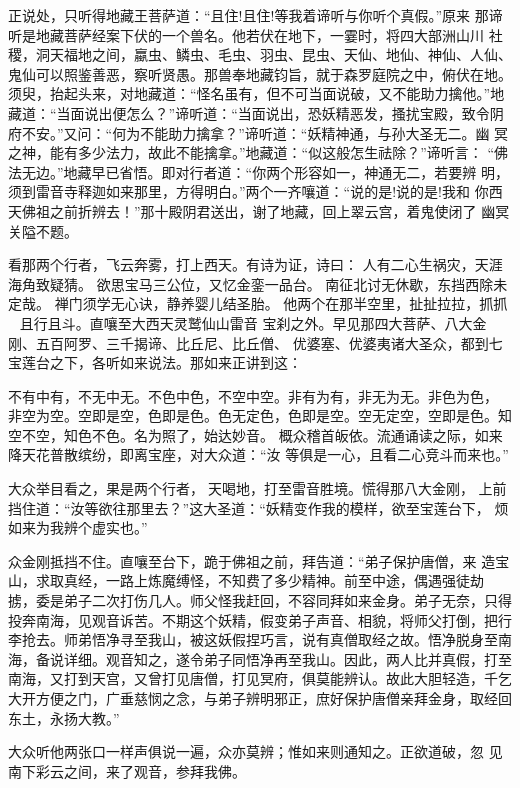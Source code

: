 正说处，只听得地藏王菩萨道：“且住!且住!等我着谛听与你听个真假。”原来
那谛听是地藏菩萨经案下伏的一个兽名。他若伏在地下，一霎时，将四大部洲山川
社稷，洞天福地之间，蠃虫、鳞虫、毛虫、羽虫、昆虫、天仙、地仙、神仙、人仙、
鬼仙可以照鉴善恶，察听贤愚。那兽奉地藏钧旨，就于森罗庭院之中，俯伏在地。
须臾，抬起头来，对地藏道：“怪名虽有，但不可当面说破，又不能助力擒他。”地
藏道：“当面说出便怎么？”谛听道：“当面说出，恐妖精恶发，搔扰宝殿，致令阴
府不安。”又问：“何为不能助力擒拿？”谛听道：“妖精神通，与孙大圣无二。幽
冥之神，能有多少法力，故此不能擒拿。”地藏道：“似这般怎生祛除？”谛听言：
“佛法无边。”地藏早已省悟。即对行者道：“你两个形容如一，神通无二，若要辨
明，须到雷音寺释迦如来那里，方得明白。”两个一齐嚷道：“说的是!说的是!我和
你西天佛祖之前折辨去！”那十殿阴君送出，谢了地藏，回上翠云宫，着鬼使闭了
幽冥关隘不题。

看那两个行者，飞云奔雾，打上西天。有诗为证，诗曰：
人有二心生祸灾，天涯海角致疑猜。
欲思宝马三公位，又忆金銮一品台。
南征北讨无休歇，东挡西除未定哉。
禅门须学无心诀，静养婴儿结圣胎。
他两个在那半空里，扯扯拉拉，抓抓，且行且斗。直嚷至大西天灵鹫仙山雷音
宝刹之外。早见那四大菩萨、八大金刚、五百阿罗、三千揭谛、比丘尼、比丘僧、
优婆塞、优婆夷诸大圣众，都到七宝莲台之下，各听如来说法。那如来正讲到这：

不有中有，不无中无。不色中色，不空中空。非有为有，非无为无。非色为色，
非空为空。空即是空，色即是色。色无定色，色即是空。空无定空，空即是色。知
空不空，知色不色。名为照了，始达妙音。
概众稽首皈依。流通诵读之际，如来降天花普散缤纷，即离宝座，对大众道：“汝
等俱是一心，且看二心竞斗而来也。”

大众举目看之，果是两个行者，天喝地，打至雷音胜境。慌得那八大金刚，
上前挡住道：“汝等欲往那里去？”这大圣道：“妖精变作我的模样，欲至宝莲台下，
烦如来为我辨个虚实也。”

众金刚抵挡不住。直嚷至台下，跪于佛祖之前，拜告道：“弟子保护唐僧，来
造宝山，求取真经，一路上炼魔缚怪，不知费了多少精神。前至中途，偶遇强徒劫
掳，委是弟子二次打伤几人。师父怪我赶回，不容同拜如来金身。弟子无奈，只得
投奔南海，见观音诉苦。不期这个妖精，假变弟子声音、相貌，将师父打倒，把行
李抢去。师弟悟净寻至我山，被这妖假捏巧言，说有真僧取经之故。悟净脱身至南
海，备说详细。观音知之，遂令弟子同悟净再至我山。因此，两人比并真假，打至
南海，又打到天宫，又曾打见唐僧，打见冥府，俱莫能辨认。故此大胆轻造，千乞
大开方便之门，广垂慈悯之念，与弟子辨明邪正，庶好保护唐僧亲拜金身，取经回
东土，永扬大教。”

大众听他两张口一样声俱说一遍，众亦莫辨；惟如来则通知之。正欲道破，忽
见南下彩云之间，来了观音，参拜我佛。

